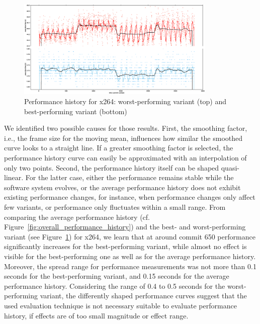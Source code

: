 \begin{figure}[t!]
\centering
\includegraphics[width=0.85\textwidth]{images/x264_best_worst.eps}
\caption{Performance history for x264: worst-performing variant (top) and
best-performing variant (bottom)}
\label{fig:x264_worstbest}
\end{figure}

We identified two possible causes for those results. First, the smoothing
factor, i.e., the frame size for the moving mean, influences how similar the
smoothed curve looks to a straight line. If a greater smoothing factor is
selected, the performance history curve can easily be approximated with an
interpolation of only two points. Second, the performance history itself can be
shaped quasi-linear. For the latter case, either the performance remains stable
while the software system evolves, or the average performance history does not
exhibit existing performance changes, for instance, when performance changes
only affect few variants, or performance only fluctuates within a small range.
From comparing the average performance history (cf.
Figure~\ref{fig:overall_performance_history}) and the best- and
worst-performing variant (see Figure~\ref{fig:x264_worstbest}) for x264, we
learn that at around commit 650 performance significantly increases for the
best-performing variant, while almost no effect is visible for the
best-performing one as well as for the average performance history. Moreover, the spread range for performance measurements was not more than 0.1 seconds for
the best-performing variant, and 0.15 seconds for the average performance
history. Considering the range of 0.4 to 0.5 seconds for the worst-performing
variant, the differently shaped performance curves suggest that the used
evaluation technique is not necessary suitable to evaluate performance history,
if effects are of too small magnitude or effect range.

